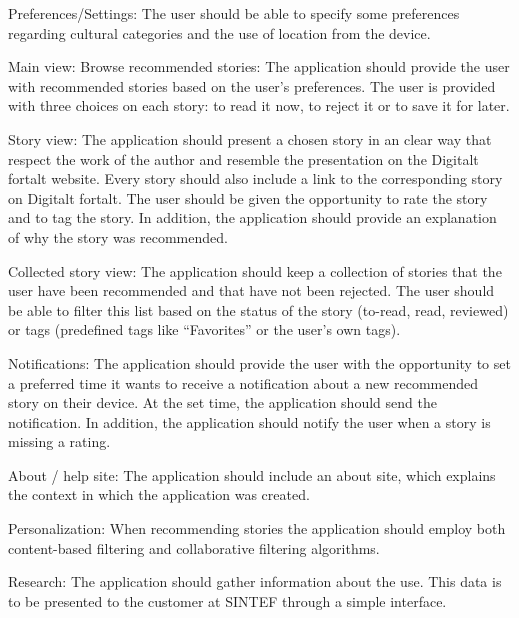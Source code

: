 Preferences/Settings: The user should be able to specify some preferences regarding cultural categories and the use of location from the device.\newline

Main view: Browse recommended stories: The application should provide the user with recommended stories based on the user’s preferences. The user is provided with three choices on each story: to read it now, to reject it or to save it for later.\newline

Story view: The application should present a chosen story in an clear way that respect the work of the author and resemble the presentation on the Digitalt fortalt website. Every story should also include a link to the corresponding story on Digitalt fortalt. The user should be given the opportunity to rate the story and to tag the story. In addition, the application should provide an explanation of why the story was recommended.\newline

Collected story view: The application should keep a collection of stories that the user have been recommended and that have not been rejected. The user should be able to filter this list based on the status of the story (to-read, read, reviewed) or tags (predefined tags like “Favorites” or the user's own tags).\newline

Notifications: The application should provide the user with the opportunity to set a preferred time it wants to receive a notification about a new recommended story on their device. At the set time, the application should send the notification. In addition, the application should notify the user when a story is missing a rating.\newline

About / help site: The application should include an about site, which explains the context in which the application was created. \newline

Personalization: When recommending stories the application should employ both content-based filtering and collaborative filtering algorithms.\newline

Research: The application should gather information about the use. This data is to be presented to the customer at SINTEF through a simple interface.\newline

